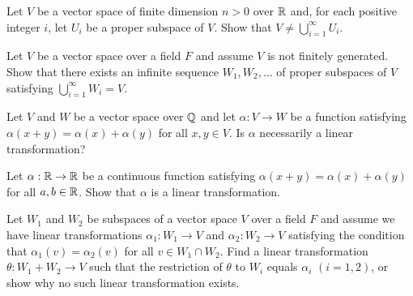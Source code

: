 \medskip

\begin{problem}[Golan 199]
Let $V$ be a vector space of finite dimension $n>0$ over $\mathbb{R}$ and, for each
positive integer $i$, let $U_i$ be a proper subspace of $V$.  
Show that $V \neq \bigcup_{i=1}^\infty U_i$.
\end{problem}

\probskip

\begin{problem}[Golan 210]
Let $V$ be a vector space over a field $F$ and assume $V$ is not finitely
generated.  Show that there exists an infinite sequence $W_1, W_2, \dots$ of
proper subspaces of $V$ satisfying $\bigcup_{i=1}^\infty W_i = V$.
\end{problem}

\probskip


\begin{ex}[Golan 239]
Let $V$ and $W$ be a vector space over $\mathbb{Q}$ and let 
$\alpha: V \rightarrow W$ be a function satisfying 
$\alpha(x+y) = \alpha(x) + \alpha(y)$ for all $x, y \in V$.
Is $\alpha$ necessarily a linear transformation?
\end{ex}

\probskip

\begin{ex}[Golan 240]
Let $\alpha: \mathbb{R} \rightarrow \mathbb{R}$ be a continuous function satisfying
$\alpha (x + y) = \alpha(x) + \alpha(y)$ for all $a, b \in \mathbb{R}$.  Show that
$\alpha$ is a linear transformation.
\end{ex}

\probskip


\begin{problem}[Golan 241]
Let $W_1$ and $W_2$ be subspaces of a vector space $V$ over a field $F$ and assume
we have linear transformations 
$\alpha_1: W_1 \rightarrow V$ and 
$\alpha_2: W_2 \rightarrow V$ satisfying the condition that $\alpha_1(v) = \alpha_2(v)$
for all $v \in W_1 \cap W_2$.  Find a linear transformation 
$\theta: W_1 + W_2 \rightarrow V$ such that the restriction of $\theta$ to $W_i$
equals $\alpha_i$ $(i=1, 2)$, or show why no such linear transformation exists.
\end{problem}

